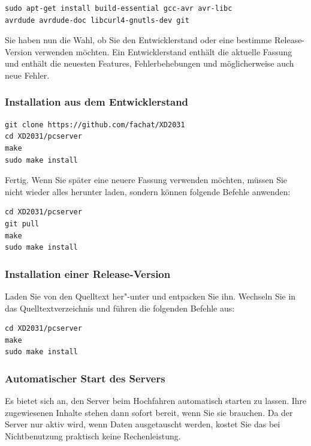 \documentclass[10pt,a4paper]{scrartcl}		%
\begin{document}
\begin{verbatim}
sudo apt-get install build-essential gcc-avr avr-libc 
avrdude avrdude-doc libcurl4-gnutls-dev git
\end{verbatim}

Sie haben nun die Wahl, ob Sie den Entwicklerstand oder eine
bestimme Release-Version verwenden möchten. Ein Entwicklerstand
enthält die aktuelle Fassung und enthält die neuesten Features,
Fehlerbehebungen und möglicherweise auch neue Fehler.

\subsubsection{Installation aus dem Entwicklerstand}

\begin{verbatim}
git clone https://github.com/fachat/XD2031
cd XD2031/pcserver
make
sudo make install
\end{verbatim}

Fertig. Wenn Sie später eine neuere Fassung verwenden möchten, müssen Sie
nicht wieder alles herunter laden, sondern können folgende Befehle
anwenden:

\begin{verbatim}
cd XD2031/pcserver
git pull
make
sudo make install
\end{verbatim}

\subsubsection{Installation einer Release-Version}
Laden Sie von \srcdownloads{}  den Quelltext her"-unter und
entpacken Sie ihn. Wechseln Sie in das Quelltextverzeichnis
und führen die folgenden Befehle aus:

\begin{lstlisting}
cd XD2031/pcserver
make
sudo make install
\end{lstlisting}

\subsubsection{Automatischer Start des Servers}
Es bietet sich an, den Server beim Hochfahren automatisch
starten zu lassen. Ihre zugewiesenen Inhalte stehen dann sofort
bereit, wenn Sie sie brauchen. Da der Server nur aktiv wird,
wenn Daten ausgetauscht werden, kostet Sie das bei Nichtbenutzung praktisch
keine Rechenleistung.
\end{document}
